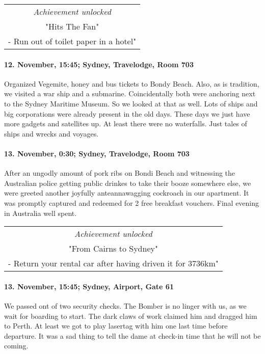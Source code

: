 \begin{center}
\begin{tabular}{||c||}
\emph{Achievement unlocked}\\
"Hits The Fan"\\
\multicolumn{1}{||p{0.8\textwidth}||}{\footnotesize - Run out of toilet paper in a hotel"} \\
\end{tabular}
\end{center}

\paragraph{12. November, 15:45; Sydney, Travelodge, Room 703}
Organized Vegemite, honey and bus tickets to Bondy Beach.
Also, as is tradition, we visited a war ship and a submarine.
Coincidentally both were anchoring next to the Sydney Maritime Museum.
So we looked at that as well.
Lots of ships and big corporations were already present in the old days.
These days we just have more gadgets and satellites up.
At least there were no waterfalls.
Just tales of ships and wrecks and voyages.

\paragraph{13. November, 0:30; Sydney, Travelodge, Room 703}
After an ungodly amount of pork ribs on Bondi Beach and witnessing the Australian police getting public drinkes to take their booze somewhere else, we were greeted another joyfully anteannawagging cockroach in our apartment.
It was promptly captured and redeemed for 2 free breakfast vouchers.
Final evening in Australia well spent.

\begin{center}
\begin{tabular}{||c||}
\emph{Achievement unlocked}\\
"From Cairns to Sydney"\\
\multicolumn{1}{||p{0.8\textwidth}||}{\footnotesize - Return your rental car after having driven it for 3736km"} \\
\end{tabular}
\end{center}

\paragraph{13. November, 15:45; Sydney, Airport, Gate 61}
We passed ont of two security checks.
The Bomber is no linger with us, as we wait for boarding to start.
The dark claws of work claimed him and dragged him to Perth.
At least we got to play lasertag with him one last time before departure.
It was a sad thing to tell the dame at check-in time that he will not be coming.


